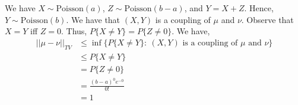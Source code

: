 \documentclass[12pt]{article}
\newenvironment{problem}[2][Problem]{\begin{trivlist}
\item[\hskip \labelsep {\bfseries #1}\hskip \labelsep {\bfseries #2.}]}{\end{trivlist}}
\begin{document}
\begin{problem}{III}
\end{problem}

We have $X \sim \text{Poisson}(a)$, $Z \sim \text{Poisson}(b-a)$, and $Y = X + Z$. Hence, $Y \sim \text{Poisson}(b)$. We have that $(X, Y)$ is a coupling of $\mu$ and $\nu$. Observe that $X = Y$ iff $Z = 0$. Thus, $P\{X \neq Y\} = P\{Z \neq 0\}$. We have,
\begin{align*}
|| \mu - \nu ||_{TV} &\leq \inf \{P\{X \neq Y\} : \ (X, Y) \text{ is a coupling of } \mu \text{ and } \nu\}\\
&\leq P\{X \neq Y\}\\
&= P\{Z \neq 0\}\\
&= \frac{(b-a)^0 e^{-0}}{0!}\\
&= 1
\end{align*}
\end{document}
